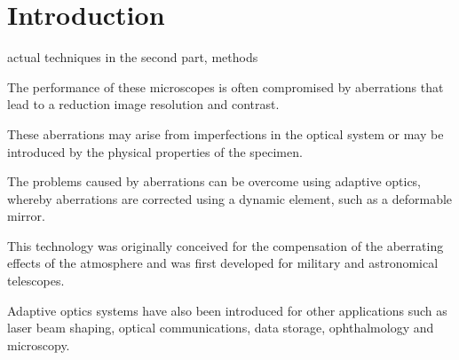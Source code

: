\section{Introduction}
\label{sec:Introduction}

actual techniques in the second part, methods


\cite{adaptive_optics_bio_microscope}


The performance of these microscopes is often compromised by aberrations that lead to a reduction image resolution and contrast. 

These aberrations may arise from imperfections in the optical system or may be introduced by the physical properties of the specimen.
 
The problems caused by aberrations can be overcome using adaptive optics, whereby aberrations are corrected using a dynamic element, such as a deformable mirror.

This technology was originally conceived for the compensation of the aberrating effects of the atmosphere and was first developed for military and astronomical telescopes. 

Adaptive optics systems have also been introduced for other applications such as laser beam shaping, optical communications, data storage, ophthalmology and microscopy.\\

